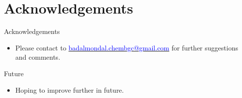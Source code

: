 \section{Acknowledgements}
\begin{frame}{Acknowledgements}
\begin{itemize}
    \item Please contact to \href{mailto:badalmondal.chembgc@gmail.com}{\textcolor{blue}{badalmondal.chembgc@gmail.com}} for further suggestions and comments.
\end{itemize}
\end{frame}
\begin{frame}{Future}
    \begin{itemize}
        \item Hoping to improve further in future.
    \end{itemize}
\end{frame}
